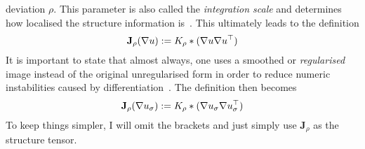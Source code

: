 deviation $\rho$. This parameter is also
called the \textit{integration scale} and determines how localised the structure information
is~\cite{ipcv}.
This ultimately leads to the definition
\begin{equation}
    \mathbf{J}_\rho(\mathbf{\nabla} u) := K_\rho * (\mathbf{\nabla} u\mathbf{\nabla} u^\top)
\end{equation}
It is important to state that almost always, one uses a smoothed or \textit{regularised} image instead of the
original unregularised form in order to reduce numeric instabilities caused by
differentiation~\cite{ipcv}. The definition then becomes
\begin{equation}
    \mathbf{J}_\rho(\mathbf{\nabla} u_\sigma) := K_\rho * (\mathbf{\nabla} u_\sigma\mathbf{\nabla}
    u_\sigma^\top)\label{def:StructTensor}
\end{equation}
To keep things simpler, I will omit the brackets and just simply use $\mathbf{J}_\rho$ as the
structure tensor.
